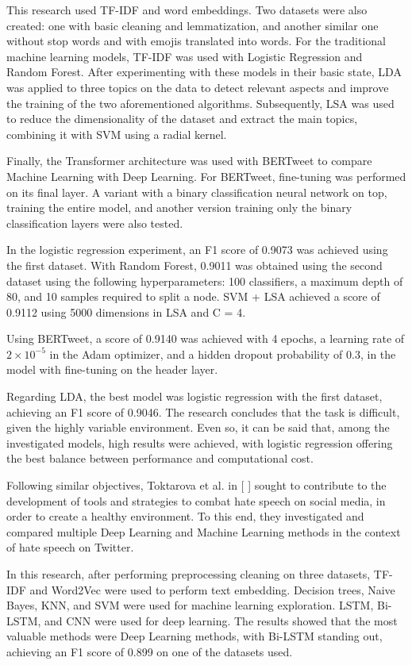 This research used TF-IDF and word embeddings. Two datasets were also created: one with basic cleaning and lemmatization, and another similar one without stop words and with emojis translated into words.
For the traditional machine learning models, TF-IDF was used with Logistic Regression and Random Forest. After experimenting with these models in their basic state, LDA was applied to three topics on the data to detect relevant aspects and improve the training of the two aforementioned algorithms. Subsequently, LSA was used to reduce the dimensionality of the dataset and extract the main topics, combining it with SVM using a radial kernel.

Finally, the Transformer architecture was used with BERTweet to compare Machine Learning with Deep Learning. For BERTweet, fine-tuning was performed on its final layer. A variant with a binary classification neural network on top, training the entire model, and another version training only the binary classification layers were also tested.


In the logistic regression experiment, an F1 score of 0.9073 was achieved using the first dataset. With Random Forest, 0.9011 was obtained using the second dataset using the following hyperparameters: 100 classifiers, a maximum depth of 80, and 10 samples required to split a node. SVM + LSA achieved a score of 0.9112 using 5000 dimensions in LSA and C = 4.


Using BERTweet, a score of 0.9140 was achieved with 4 epochs, a learning rate of $2 \times 10^{-5}$ in the Adam optimizer, and a hidden dropout probability of 0.3, in the model with fine-tuning on the header layer.

Regarding LDA, the best model was logistic regression with the first dataset, achieving an F1 score of 0.9046. The research concludes that the task is difficult, given the highly variable environment. Even so, it can be said that, among the investigated models, high results were achieved, with logistic regression offering the best balance between performance and computational cost.


Following similar objectives, Toktarova et al. in [ ] sought to contribute to the development of tools and strategies to combat hate speech on social media, in order to create a healthy environment. To this end, they investigated and compared multiple Deep Learning and Machine Learning methods in the context of hate speech on Twitter.

In this research, after performing preprocessing cleaning on three datasets, TF-IDF and Word2Vec were used to perform text embedding. Decision trees, Naive Bayes, KNN, and SVM were used for machine learning exploration. LSTM, Bi-LSTM, and CNN were used for deep learning.
The results showed that the most valuable methods were Deep Learning methods, with Bi-LSTM standing out, achieving an F1 score of 0.899 on one of the datasets used.

